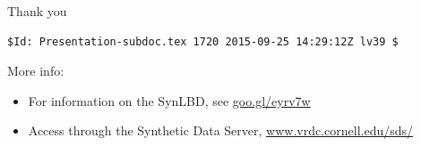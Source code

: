 \setcounter{finalframe}{\value{framenumber}}
\setcounter{framenumber}{\value{finalframe}}


\begin{frame}
Thank you
\end{frame}


\begin{frame}[fragile]

\tiny\vspace{0.8\textheight}\vfill 
\begin{verbatim}
$Id: Presentation-subdoc.tex 1720 2015-09-25 14:29:12Z lv39 $
\end{verbatim}
\end{frame}



\begin{frame}
\begin{center}
More info: 
\begin{itemize}
\item For information on the SynLBD, see 
\href{http://www2.vrdc.cornell.edu/news/data/lbd-synthetic-data/}{goo.gl/eyrv7w}
\item Access through the Synthetic Data Server, 
\href{http://www.vrdc.cornell.edu/sds/}{www.vrdc.cornell.edu/sds/} 
\end{itemize}

\end{center}
\end{frame}

